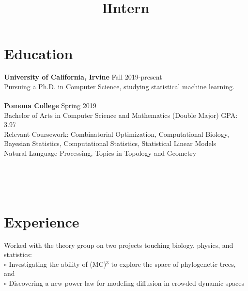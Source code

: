 \documentclass[margin]{res}
\begin{document}
\begin{resume}

\section{Education}
\textbf{University of California, Irvine} \hfill Fall 2019-present\\
Pursuing a Ph.D. in Computer Science, studying statistical machine learning.\\ \\
\textbf{Pomona College} \hfill Spring 2019\\
Bachelor of Arts in Computer Science and Mathematics (Double Major) \hfill 
GPA: 3.97\\
Relevant Coursework: Combinatorial Optimization, Computational Biology,\\
Bayesian Statistics, Computational Statistics, Statistical Linear Models\\
Natural Language Processing, Topics in Topology and Geometry



\begin{format}
\title{l}\\
\\
\body\\
\end{format}
\section{Experience}

\title{\textbf{Intern}}
\begin{position}
Worked with the theory group on two projects touching biology, physics, and statistics:\\
$\circ$ Investigating the ability of (MC)$^3$ to explore the space of phylogenetic trees, and \\
$\circ$ Discovering a new power law for modeling diffusion in crowded dynamic spaces
\end{position}



\end{resume}
\end{document}
